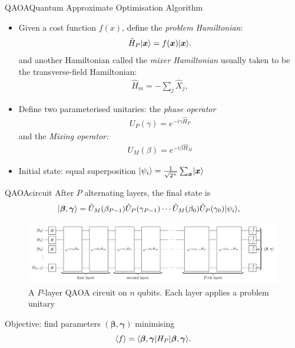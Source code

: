 \begin{frame}{QAOA}{Quantum Approximate Optimisation Algorithm}
\begin{itemize}
    \item Given a cost function $f(x)$, define the \textit{problem Hamiltonian}:
\begin{align}
    \hat{H}_{P} \lvert\boldsymbol{x}\rangle = f(\boldsymbol{x}) \lvert\boldsymbol{x}\rangle. \label{eq:Hp}
\end{align} and another Hamiltonian called the \textit{mixer Hamiltonian} usually taken to be the transverse-field Hamiltonian:
\begin{align}
    \hat{H}_{m} = - \sum_{j} \hat{X}_{j}, \label{eq:Hm}
\end{align}
\item Define two parameterised unitaries: the \textit{phase operator}
    \begin{align}
        U_{P}(\gamma) = e^{-i \gamma \hat{H}_{P}} \label{eq:up}
    \end{align}
    and the \textit{Mixing operator:} \begin{align}
        U_{M}(\beta) = e^{-i \beta \hat{H}_{M}} \label{eq:um}
    \end{align}
\item Initial state: equal superposition $\lvert\psi_{i}\rangle = \frac{1}{\sqrt{2^{n}}} \sum_{\boldsymbol{x}} \lvert\boldsymbol{x}\rangle$
\end{itemize}
\end{frame}

\begin{frame}{QAOA}{circuit}
After $P$ alternating layers, the final state is
\begin{align}
    \lvert\boldsymbol\beta, \boldsymbol\gamma\rangle &= \hat{U}_{M}(\beta_{P-1}) \hat{U}_{P}(\gamma_{P-1}) \cdots 
    \hat{U}_{M}(\beta_{0}) \hat{U}_{P}(\gamma_{0}) \lvert\psi_{i}\rangle, \label{qaoa-equation}
\end{align}
\begin{figure}[H]
    \centering
    \includegraphics[width=\textwidth]{pictures/circdiagram.pdf}
    \caption{
        A $P$-layer QAOA circuit on $n$ qubits. Each layer applies a problem unitary 
    }
    \label{qaoa-circ}
\end{figure}
Objective: find parameters $(\boldsymbol{\beta}, \boldsymbol{\gamma})$ minimising
    \[
        \langle f \rangle = \langle\boldsymbol\beta, \boldsymbol\gamma\rvert H_{P} \lvert\boldsymbol\beta, \boldsymbol\gamma\rangle.
    \]
\end{frame}

